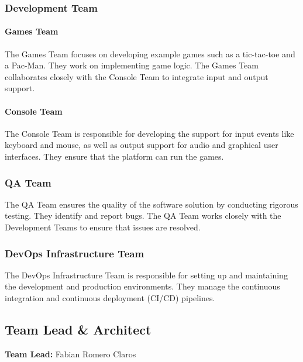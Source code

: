 \documentclass{article}
\begin{document}
\hypertarget{devteamrole}{
\subsubsection{Development Team}\label{devteamrole}}

\hypertarget{gamesteam}{
\paragraph{Games Team}\label{gamesteam}}
The Games Team focuses on developing example games such as a tic-tac-toe and a Pac-Man. They work on implementing game logic. The Games Team collaborates closely with the Console Team to integrate input and output support.

\hypertarget{consoleteam}{
\paragraph{Console Team}\label{consoleteam}}
The Console Team is responsible for developing the support for input events like keyboard and mouse, as well as output support for audio and graphical user interfaces. They ensure that the platform can run the games.

\hypertarget{qateamrole}{
\subsubsection{QA Team}\label{qateamrole}}
The QA Team ensures the quality of the software solution by conducting rigorous testing. They identify and report bugs. The QA Team works closely with the Development Teams to ensure that issues are resolved.

\hypertarget{devops}{
\subsubsection{DevOps Infrastructure Team}\label{devops}}
The DevOps Infrastructure Team is responsible for setting up and maintaining the development and production environments. They manage the continuous integration and continuous deployment (CI/CD) pipelines.


\hypertarget{teamleadarchitect}{
\subsection{Team Lead \& Architect}\label{teamleadarchitect}}

\textbf{Team Lead:}
Fabian Romero Claros
\end{document}
